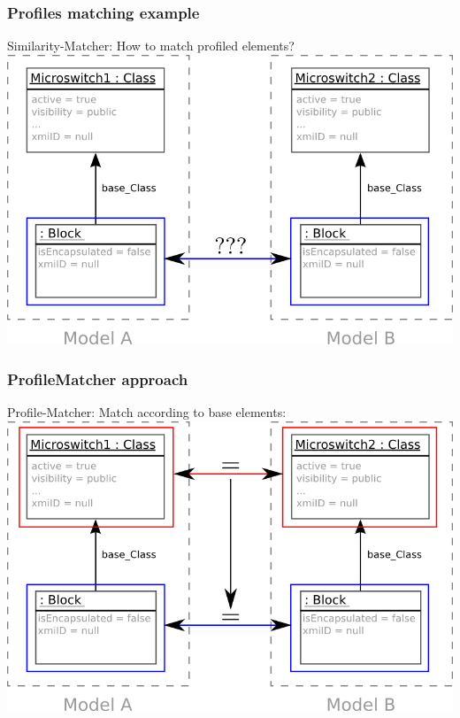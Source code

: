 \documentclass[10pt]{beamer}
\begin{document}
\begin{frame}
\frametitle{Profiles matching example}
\begin{center}
Similarity-Matcher: How to match profiled elements? \\
\medskip
\includegraphics[scale=0.8]{profilematcher_example4}\\
\end{center}

\end{frame}
\begin{frame}
\frametitle{ProfileMatcher approach}
\begin{center}
Profile-Matcher: Match according to base elements: \\
\medskip
\includegraphics[scale=0.8]{profilematcher_example5}\\
\end{center}
\end{frame}
\end{document}
